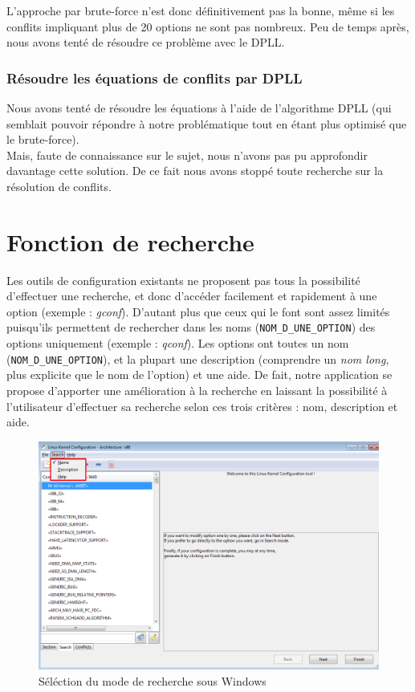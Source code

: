 \documentclass[17pts]{report}
\begin{document}
L'approche par brute-force n'est donc définitivement pas la bonne, même si les
conflits impliquant plus de 20 options ne sont pas nombreux.
Peu de temps après, nous avons tenté de résoudre ce problème avec le DPLL.\\

\subsubsection{Résoudre les équations de conflits par DPLL}
\label{ssub:Résoudre les équations de conflits par DPLL}
Nous avons tenté de résoudre les équations à l'aide de l'algorithme DPLL (qui
semblait pouvoir répondre à notre problématique tout en étant plus optimisé
que le brute-force).\\
Mais, faute de connaissance sur le sujet, nous n'avons pas pu
approfondir davantage cette solution. De ce fait nous avons stoppé toute
recherche sur la résolution de conflits.


\section{Fonction de recherche}
\label{sec:Fonction de recherche}
Les outils de configuration existants ne proposent pas tous la possibilité
d'effectuer une recherche, et donc d'accéder facilement et rapidement à une
option (exemple : \textit{gconf}). D'autant plus que ceux qui le font sont
assez limités puisqu'ils permettent de rechercher dans les noms
(\verb|NOM_D_UNE_OPTION|) des options uniquement (exemple : \textit{qconf}).
Les options ont toutes un nom (\verb|NOM_D_UNE_OPTION|), et la plupart une
description (comprendre un \textit{nom long}, plus explicite que le nom de
l'option) et une aide.  De fait, notre application se propose d'apporter une
amélioration à la recherche en laissant la possibilité à l'utilisateur
d'effectuer sa recherche selon ces trois critères : nom, description et aide.\\

\begin{figure}[H]
    \includegraphics[scale=0.4]{./illustrations/screen_search.png}
    \centering
    \caption{Séléction du mode de recherche sous Windows}
    \label{fig:ModesDeRecherche}
\end{figure}
\end{document}
